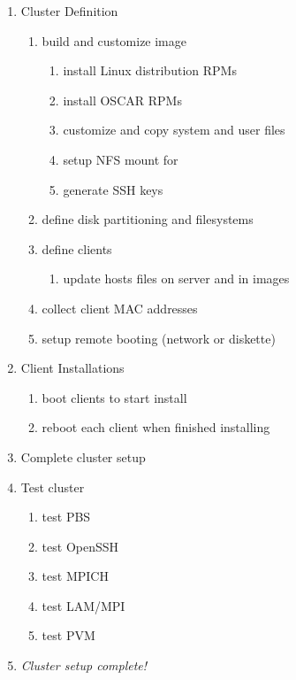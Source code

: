 \begin{enumerate}
\item Cluster Definition
  \begin{enumerate}
  \item build and customize image
    \begin{enumerate}
    \item install Linux distribution RPMs
    \item install OSCAR RPMs
    \item customize and copy system and user files
    \item setup NFS mount for 
    \item generate SSH keys
    \end{enumerate}
  \item define disk partitioning and filesystems
  \item define clients
    \begin{enumerate}
    \item update hosts files on server and in images
    \end{enumerate}
  \item collect client MAC addresses
  \item setup remote booting (network or diskette)
  \end{enumerate}
  
\item Client Installations
  \begin{enumerate}
  \item boot clients to start install
  \item reboot each client when finished installing
  \end{enumerate}
\item Complete cluster setup
\item Test cluster
  \begin{enumerate}
  \item test PBS
  \item test OpenSSH
  \item test MPICH
  \item test LAM/MPI
  \item test PVM
  \end{enumerate}
\item \emph{Cluster setup complete!}
\end{enumerate}
